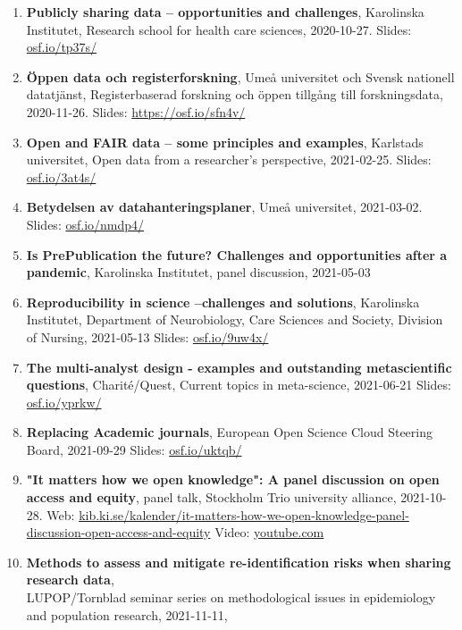 \documentclass[10pt]{article}
\begin{document}
\begin{enumerate}[nolistsep]
\item \textbf{Publicly sharing data – opportunities and challenges}, Karolinska Institutet, Research school for health care sciences, 2020-10-27. Slides: \href{https://osf.io/tp37s/}{osf.io/tp37s/}
\item \textbf{Öppen data och registerforskning}, Umeå universitet och Svensk nationell datatjänst, Registerbaserad forskning och öppen tillgång till forskningsdata, 2020-11-26. Slides: \href{https://osf.io/sfn4v/}{https://osf.io/sfn4v/}
\item \textbf{Open and FAIR data – some principles and examples}, Karlstads universitet, Open data from a researcher's perspective, 2021-02-25. Slides: \href{https://osf.io/3at4s/}{osf.io/3at4s/}
\item \textbf{Betydelsen av datahanteringsplaner}, Umeå universitet, 2021-03-02. Slides: \href{https://osf.io/nmdp4/}{osf.io/nmdp4/}
\item \textbf{Is PrePublication the future? Challenges and opportunities after a pandemic}, Karolinska Institutet, panel discussion, 2021-05-03
\item \textbf{Reproducibility in science –challenges and solutions}, Karolinska Institutet, Department of Neurobiology, Care Sciences and Society, Division of Nursing, 2021-05-13
Slides: \href{https://osf.io/9uw4x/}{osf.io/9uw4x/}
\item \textbf{The multi-analyst design - examples and outstanding metascientific questions}, Charité/Quest, Current topics in meta-science, 2021-06-21
Slides: \href{https://osf.io/yprkw/}{osf.io/yprkw/}
\item \textbf{Replacing Academic journals}, European Open Science Cloud Steering Board, 2021-09-29
Slides: \href{https://osf.io/uktqb/}{osf.io/uktqb/}
\item  \textbf{"It matters how we open knowledge": A panel discussion on open access and equity}, panel talk, Stockholm Trio university alliance, 2021-10-28.
Web: \href{https://kib.ki.se/kalender/it-matters-how-we-open-knowledge-panel-discussion-open-access-and-equity}{kib.ki.se/kalender/it-matters-how-we-open-knowledge-panel-discussion-open-access-and-equity} Video: \href{https://www.youtube.com/watch?v=6oZbVTqhX5o}{youtube.com}
\item \textbf{Methods to assess and mitigate re-identification risks when sharing research data}, \\LUPOP/Tornblad seminar series on methodological issues in epidemiology and population research, 2021-11-11,

\end{enumerate}
\end{document}
